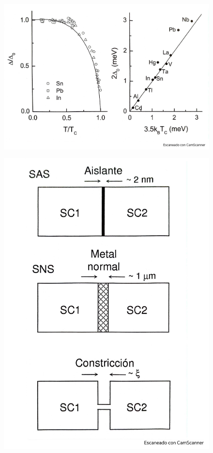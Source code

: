 \begin{figure}[h!] \centering
	\includegraphics[scale=0.5]{Cuerpo/Ch_11/Fotos libro 21.pdf}
	\caption{}
	\label{Fig:11-21}
\end{figure}
\begin{figure}[h!] \centering
	\includegraphics[scale=0.5]{Cuerpo/Ch_11/Fotos libro 22.pdf}
	\caption{}
	\label{Fig:11-22}
\end{figure}
